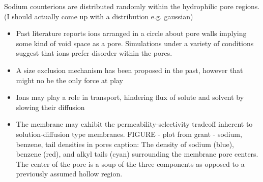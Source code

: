 \documentclass{article}
\begin{document}
	Sodium counterions are distributed randomly within the hydrophilic pore regions. (I should actually come up with a distribution e.g. gaussian) 
	\begin{itemize}
		\item Past literature reports ions arranged in a circle about pore walls implying some kind of void space as a pore. Simulations under a variety of conditions suggest that ions prefer disorder within the pores. 
		\item A size exclusion mechanism has been proposed in the past, however that might no be the only force at play
		\item Ions may play a role in transport, hindering flux of solute and solvent by slowing their diffusion
		\item The membrane may exhibit the permeability-selectivity tradeoff inherent to solution-diffusion type membranes.
		FIGURE - plot from grant - sodium, benzene, tail densities in pores
		caption: The density of sodium (blue), benzene (red), and alkyl tails (cyan) surrounding the membrane pore centers. The center of the pore is a soup of the three components as opposed to a previously assumed hollow region. 
        \end{itemize}	

\end{document}
